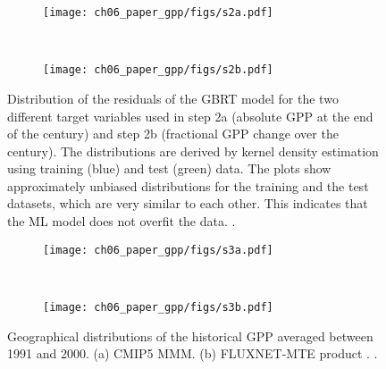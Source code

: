 \begin{figure}[p]
  \centering
  \begin{subfigure}[b]{\SubfigureWidth{}}
    \texttt{[image: ch06\_paper\_gpp/figs/s2a.pdf]}
    \caption{}
    \label{fig:app:b:residuals:a}
  \end{subfigure}
  ~
  \begin{subfigure}[b]{\SubfigureWidth{}}
    \texttt{[image: ch06\_paper\_gpp/figs/s2b.pdf]}
    \caption{}
    \label{fig:app:b:residuals:b}
  \end{subfigure}
  \caption[
    Distribution of the residuals of the \acf{GBRT} model for the two different
    target variables used in step 2a and step 2b.
  ]{
    Distribution of the residuals of the \acf{GBRT} model for the two different
    target variables used in step 2a (absolute \acf{GPP} at the end of the
     century) and step 2b (fractional \acs{GPP} change over the
     century). The distributions are derived by kernel density
    estimation using training (blue) and test (green) data. The plots show
    approximately unbiased distributions for the training and the test
    datasets, which are very similar to each other. This indicates that the
    \acl{ML} model does not overfit the data. .
  }
  \label{fig:app:b:residuals}
\end{figure}

\begin{figure}[p]
  \centering
  \begin{subfigure}[b]{\SubfigureWidth{}}
    \texttt{[image: ch06\_paper\_gpp/figs/s3a.pdf]}
    \caption{}
    \label{fig:app:b:cmip5_hist_mte:a}
  \end{subfigure}
  ~
  \begin{subfigure}[b]{\SubfigureWidth{}}
    \texttt{[image: ch06\_paper\_gpp/figs/s3b.pdf]}
    \caption{}
    \label{fig:app:b:cmip5_hist_mte:b}
  \end{subfigure}
  \caption[
    Geographical distributions of the historical \acf{GPP} averaged between
    1991 and 2000.
  ]{
    Geographical distributions of the historical \acf{GPP} averaged between
    1991 and 2000. (a) C\acs{MIP}5 \acf{MMM}. (b) FLUXNET-MTE product
    \autocite{Jung2011}. .
  }
  \label{fig:app:b:cmip5_hist_mte}
\end{figure}

